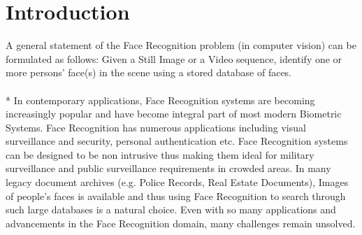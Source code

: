 \section{Introduction}

A general statement of the Face Recognition problem (in computer vision) can be formulated as follows: Given a Still Image or a Video sequence, identify one or more persons' face(s) in the scene using a stored database of faces.\\ 
\\*
In contemporary applications, Face Recognition systems are becoming increasingly popular and have become integral part of most modern Biometric Systems.  Face Recognition has   numerous applications   including   visual   surveillance   and   security, personal authentication etc. Face Recognition systems can be designed to be non intrusive thus making them ideal for military surveillance and public surveillance requirements in crowded areas. In many legacy document archives (e.g. Police Records, Real Estate Documents), Images of people's faces is available and thus using Face Recognition to search through such large databases is a natural choice. Even with so many applications and advancements in the Face Recognition domain, many challenges remain unsolved.
